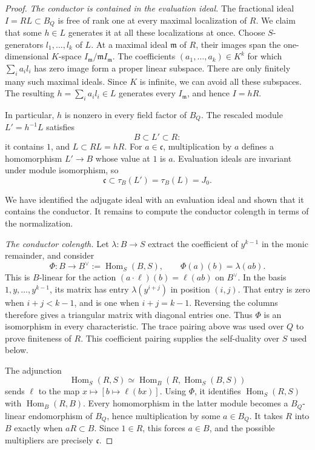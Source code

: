 \begin{proof}
\medskip
\noindent
\emph{The conductor is contained in the evaluation ideal.}
The fractional ideal \(I=RL\subset B_Q\) is free of rank one at every
maximal localization of \(R\).  We claim that some \(h\in L\) generates
it at all these localizations at once.  Choose \(S\)-generators
\(l_1,\ldots,l_k\) of \(L\).  At a maximal ideal \(\mathfrak m\) of \(R\),
their images span the one-dimensional \(K\)-space
\(I_{\mathfrak m}/\mathfrak m I_{\mathfrak m}\).  The coefficients
\((a_1,\ldots,a_k)\in K^k\) for which \(\sum_i a_i l_i\) has zero
image form a proper linear subspace.  There are only finitely many such
maximal ideals.  Since \(K\) is infinite, we can avoid all these subspaces.
The resulting \(h=\sum_i a_i l_i\in L\) generates every \(I_{\mathfrak m}\),
and hence \(I=hR\).

In particular, \(h\) is nonzero in every field factor of \(B_Q\).
The rescaled module \(L'=h^{-1}L\) satisfies
\[
 B\subset L'\subset R:
\]
it contains \(1\), and \(L\subset RL=hR\).
For \(a\in\mathfrak c\), multiplication by \(a\) defines a homomorphism
\(L'\to B\) whose value at \(1\) is \(a\).
Evaluation ideals are invariant under module isomorphism, so
\[
 \mathfrak c\subset\tau_B(L')
 =\tau_B(L)=J_0.
\]

We have identified the adjugate ideal with an evaluation ideal and shown
that it contains the conductor. It remains to compute the conductor
colength in terms of the normalization.

\medskip
\noindent
\emph{The conductor colength.}
Let \(\lambda:B\to S\) extract the coefficient of \(y^{k-1}\) in
the monic remainder, and consider
\begin{equation}
 \Phi:B\longrightarrow B^\vee:=\operatorname{Hom}_S(B,S),
 \qquad
 \Phi(a)(b)=\lambda(ab).
 \label{eq:conductor-pairing}
\end{equation}
This is \(B\)-linear for the action
\((a\cdot\ell)(b)=\ell(ab)\) on \(B^\vee\).
In the basis \(1,y,\ldots,y^{k-1}\), its matrix has entry
\(\lambda(y^{i+j})\) in position \((i,j)\).
That entry is zero when \(i+j<k-1\), and is one when \(i+j=k-1\).
Reversing the columns therefore gives a triangular matrix with diagonal
entries one.  Thus \(\Phi\) is an isomorphism in every characteristic.
The trace pairing above was used over \(Q\) to prove finiteness of \(R\).
This coefficient pairing supplies the self-duality over \(S\) used below.

The adjunction
\[
 \operatorname{Hom}_S(R,S)
 \simeq
 \operatorname{Hom}_B(R,\operatorname{Hom}_S(B,S))
\]
sends \(\ell\) to the map
\(x\mapsto[b\mapsto\ell(bx)]\).
Using \(\Phi\), it identifies \(\operatorname{Hom}_S(R,S)\) with
\(\operatorname{Hom}_B(R,B)\).
Every homomorphism in the latter module becomes a \(B_Q\)-linear
endomorphism of \(B_Q\), hence multiplication by some \(a\in B_Q\).
It takes \(R\) into \(B\) exactly when \(aR\subset B\).
Since \(1\in R\), this forces \(a\in B\), and the possible multipliers
are precisely \(\mathfrak c\).


\end{proof}
